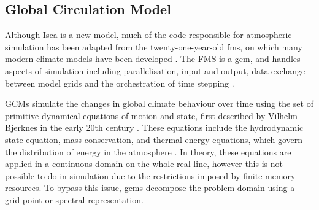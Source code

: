\documentclass[a4paper,11pt]{report}
\begin{document}
\subsection{Global Circulation Model}
Although Isca is a new model, much of the code responsible for atmospheric simulation has been adapted from the twenty-one-year-old \gls{fms}, on which many modern climate models have been developed \cite{balaji2002fms, donner2011dynamical, farneti2009intermediate}. The FMS is a \gls{gcm}, and handles aspects of simulation including parallelisation, input and output, data exchange between model grids and the orchestration of time stepping \cite{gfdl2019fms}.
\par
GCMs simulate the changes in global climate behaviour over time using the set of primitive dynamical equations of motion and state, first described by Vilhelm Bjerknes in the early 20th century \cite{bjerknes1910dynamic,edwards2011history, godske1957dynamic}. These equations include the hydrodynamic state equation, mass conservation, and thermal energy equations, which govern the distribution of energy in the atmosphere \cite{vallis2018isca,edwards2011history}. In theory, these equations are applied in a continuous domain on the whole real line, however this is not possible to do in simulation due to the restrictions imposed by finite memory resources. To bypass this issue, \gls{gcm}s decompose the problem domain using a grid-point or spectral representation.
\end{document}
